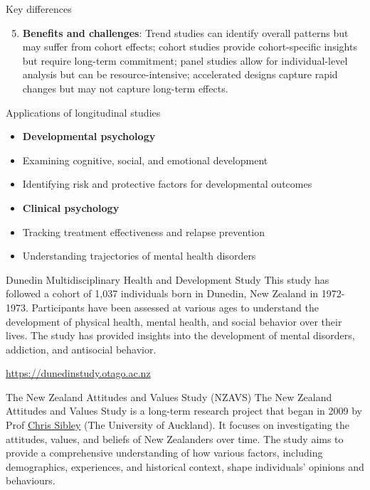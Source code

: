 \documentclass[
  ignorenonframetext,
  aspectratio=169,
]{beamer}
\providecommand{\tightlist}{%
  \setlength{\itemsep}{0pt}\setlength{\parskip}{0pt}}\usepackage{longtable,booktabs,array}
\begin{document}
\begin{frame}{Key differences}
\label{key-differences-2}
\begin{enumerate}
\setcounter{enumi}{4}
\tightlist
\item
  \textbf{Benefits and challenges}: Trend studies can identify overall
  patterns but may suffer from cohort effects; cohort studies provide
  cohort-specific insights but require long-term commitment; panel
  studies allow for individual-level analysis but can be
  resource-intensive; accelerated designs capture rapid changes but may
  not capture long-term effects.
\end{enumerate}
\end{frame}

\begin{frame}{Applications of longitudinal studies}
\label{applications-of-longitudinal-studies}
\begin{itemize}[<+->]
\tightlist
\item
  \textbf{Developmental psychology}
\item
  Examining cognitive, social, and emotional development
\item
  Identifying risk and protective factors for developmental outcomes
\item
  \textbf{Clinical psychology}
\item
  Tracking treatment effectiveness and relapse prevention
\item
  Understanding trajectories of mental health disorders
\end{itemize}
\end{frame}

\begin{frame}{Dunedin Multidisciplinary Health and Development Study}
\label{dunedin-multidisciplinary-health-and-development-study}
This study has followed a cohort of 1,037 individuals born in Dunedin,
New Zealand in 1972-1973. Participants have been assessed at various
ages to understand the development of physical health, mental health,
and social behavior over their lives. The study has provided insights
into the development of mental disorders, addiction, and antisocial
behavior.

\url{https://dunedinstudy.otago.ac.nz}
\end{frame}

\begin{frame}{The New Zealand Attitudes and Values Study (NZAVS)}
\label{the-new-zealand-attitudes-and-values-study-nzavs}
The New Zealand Attitudes and Values Study is a long-term research
project that began in 2009 by Prof \href{}{Chris Sibley} (The University
of Auckland). It focuses on investigating the attitudes, values, and
beliefs of New Zealanders over time. The study aims to provide a
comprehensive understanding of how various factors, including
demographics, experiences, and historical context, shape individuals'
opinions and behaviours.
\end{frame}
\end{document}
